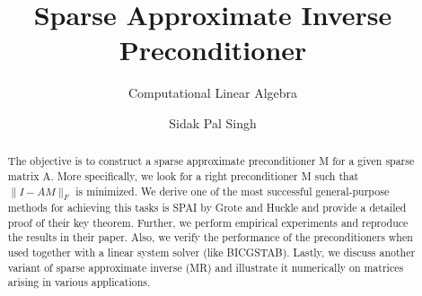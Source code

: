 \documentclass[paper=A4, fontsize=11pt]{scrartcl}
\title{Sparse Approximate Inverse Preconditioner}
\subtitle{Computational Linear Algebra}
\author{Sidak Pal Singh}
\theoremstyle{remark}
\begin{document}
	\maketitle
	\begin{abstract}
	
	
	The objective is to construct a sparse approximate preconditioner M for a given sparse matrix A. More specifically, we look for a right preconditioner M such that $\|I-A M\|_{F}$ is minimized. 
	We derive one of the most successful general-purpose methods for achieving this tasks is SPAI by Grote and Huckle \cite{grote} and provide a detailed proof of their key theorem. Further, we perform empirical experiments and reproduce the results in their paper. Also, we verify the performance of the preconditioners when used together with a linear system solver (like BICGSTAB). Lastly, we discuss another variant of sparse approximate inverse (MR) and illustrate it numerically on matrices arising in various applications.

\end{abstract}

	\newpage
	
\end{document}
